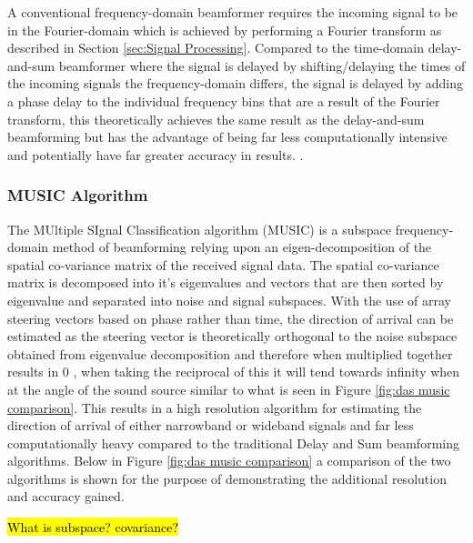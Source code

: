 \documentclass{UoNMCHA}
\numberwithin{equation}{section}
\begin{document}
    A conventional frequency-domain beamformer requires the incoming signal to be in the Fourier-domain which is achieved by performing a Fourier transform as described in Section \ref{sec:Signal Processing}. Compared to the time-domain delay-and-sum beamformer where the signal is delayed by shifting/delaying the times of the incoming signals the frequency-domain differs, the signal is delayed by adding a phase delay to the individual frequency bins that are a result of the Fourier transform, this theoretically achieves the same result as the delay-and-sum beamforming but has the advantage of being far less computationally intensive and potentially have far greater accuracy in results. \citep{Kri13}.

\subsubsection{MUSIC Algorithm} \label{sec:Intro MUSIC}
    The MUltiple SIgnal Classification algorithm (MUSIC) is a subspace frequency-domain method of beamforming relying upon an eigen-decomposition of the spatial co-variance matrix of the received signal data. The spatial co-variance matrix is decomposed into it's eigenvalues and vectors that are then sorted by eigenvalue and separated into noise and signal subspaces.
    With the use of array steering vectors based on phase rather than time, the direction of arrival can be estimated as the steering vector is theoretically orthogonal to the noise subspace obtained from eigenvalue decomposition and therefore when multiplied together results in 0 \citep{Pau} \citep{MatL}, when taking the reciprocal of this it will tend towards infinity when at the angle of the sound source similar to what is seen in Figure \ref{fig:das music comparison}. This results in a high resolution algorithm for estimating the direction of arrival of either narrowband or wideband signals and far less computationally heavy compared to the traditional Delay and Sum beamforming algorithms. Below in Figure \ref{fig:das music comparison} a comparison of the two algorithms is shown for the purpose of demonstrating the additional resolution and accuracy gained. 

    \hl{What is subspace? covariance?}
\end{document}
